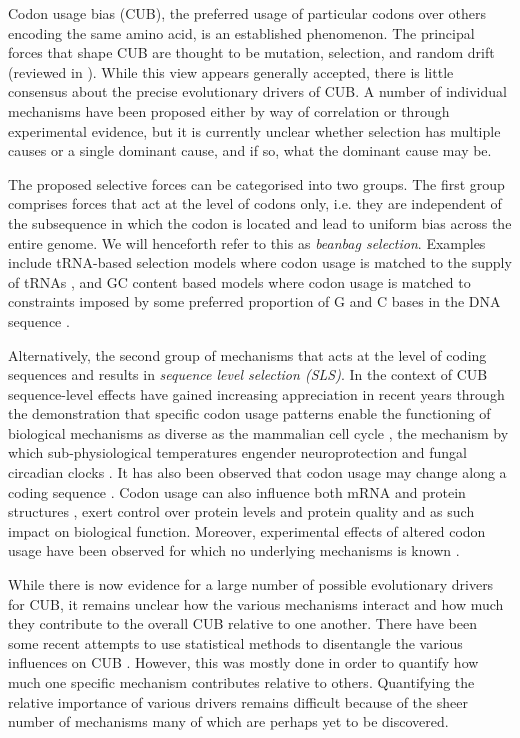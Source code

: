\documentclass[a4paper,10pt]{paper}%
\begin{document}
Codon usage bias (CUB), the preferred usage of particular codons over others encoding the same amino acid, is an established phenomenon. The principal forces that shape CUB are thought to be mutation, selection, and random drift (reviewed in \cite{fantomas7}). While this view appears generally accepted, there is little consensus about the precise evolutionary drivers  of CUB. A number of individual mechanisms have been proposed either by way of correlation or through experimental evidence, but it is currently unclear whether selection has multiple causes \cite{fantomas7,29018283} or a single dominant cause, and if so, what the dominant cause may be. 
\par
The proposed selective forces can be categorised into two groups. The first group comprises forces that act at the level of codons only, i.e. they are independent of the subsequence in which the codon is located and lead to uniform bias across the entire genome. We will henceforth refer to this as  {\em beanbag selection}.  Examples include tRNA-based selection models where codon usage is matched to the supply of tRNAs \cite{iki}, and GC content based models where codon usage is matched to constraints imposed by some preferred proportion of G and C bases in the DNA sequence \cite{fantomas8,fantomas1,fantomas2}. 
\par
Alternatively, the second group of mechanisms  that  acts at the level of coding sequences and results in {\em sequence level selection (SLS)}.  In the context of  CUB sequence-level effects  have gained increasing appreciation in recent years through the demonstration that specific codon usage patterns enable the functioning of biological mechanisms as diverse as the mammalian cell cycle \cite{fantomas10}, the mechanism by which sub-physiological temperatures engender neuroprotection \cite{fantomas11} and fungal circadian clocks \cite{23417067}.  It has also been observed that codon usage may change along a coding sequence  \cite{fantomas4,ramppaper}. Codon usage can also influence both mRNA \cite{fantomas5} and protein structures \cite{fantomas6,relcodon}, exert control over  protein levels \cite{myembopaper}  and  protein quality  \cite{fantomas9,pff}  and as such impact on biological function. Moreover, experimental effects of altered codon usage have been observed for which no underlying mechanisms is known \cite{tobiasandlynnepaper}. 
\par
While there is now  evidence for a large number of possible evolutionary drivers for CUB, it remains unclear how the various mechanisms interact and how much they contribute to the overall CUB relative to one another.  There have been some recent attempts to use statistical methods to  disentangle the various influences on CUB \cite{2110097,7713409,8893856,11729162,12140252}. However,  this was mostly done in order to quantify how much one specific mechanism contributes relative to others. Quantifying the relative importance of various drivers remains difficult because of the sheer number of mechanisms many of which are perhaps yet to be discovered. 
\end{document}
